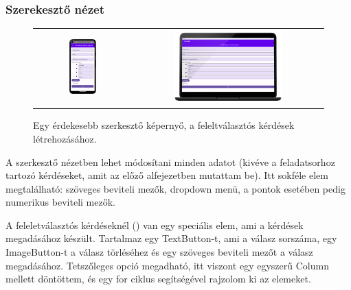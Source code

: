 \subsubsection{Szerekesztő nézet}

\begin{figure}[!ht]
    \centering
    \begin{tabular}{cc}
        \includegraphics[width=0.3\textwidth, keepaspectratio]{figures/Edit_Android.png} & 
        \includegraphics[width=0.6\textwidth, keepaspectratio]{figures/Edit_Desktop_framed.png}
    \end{tabular}
    \caption{Egy érdekesebb szerkesztő képernyő, a feleltválasztós kérdések létrehozásához.}
    \label{fig:EditScreen}
\end{figure}

A szerkesztő nézetben lehet módosítani minden adatot (kivéve a feladatsorhoz tartozó kérdéseket, amit az előző alfejezetben mutattam be).
Itt sokféle elem megtalálható: szöveges beviteli mezők, dropdown menü, a pontok esetében pedig numerikus beviteli mezők.

A feleletválasztós kérdéseknél () van egy speciális elem, ami a kérdések megadásához készült.
Tartalmaz egy TextButton-t, ami a válasz sorszáma, egy ImageButton-t a válasz törléséhez és egy szöveges beviteli mezőt a válasz megadásához.
Tetszőleges opció megadható, itt viszont egy egyszerű Column mellett döntöttem, és egy for ciklus segítségével rajzolom ki az elemeket.


